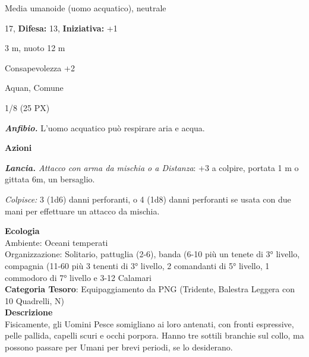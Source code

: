 \begin{multicols}{2}
{
\noindent
\begin{description}[noitemsep, topsep=0pt, parsep=0pt, partopsep=0pt, leftmargin=0cm, labelwidth=2.2cm]
	\item[\textbf{Taglia/Tipo:}] Media umanoide (uomo acquatico), neutrale
	\item[\textbf{Caratt.:}] 
	\item[\textbf{Punti Ferita:}] 17,  \textbf{Difesa:} 13,  \textbf{Iniziativa:} +1
	\item[\textbf{Movimento:}] 3 m, nuoto 12 m
	\item[\textbf{Tiri Salvez.:}] 
	\item[\textbf{Comp.:}] Consapevolezza +2
	\item[\textbf{Linguaggi:}] Aquan, Comune
	\item[\textbf{Sfida:}] 1/8 (25 PX)\smallskip
\end{description}

\emph{\textbf{Anfibio.}} L'uomo acquatico può respirare aria e acqua.

\textbf{Azioni}

\emph{\textbf{Lancia.} Attacco con arma da mischia o a Distanza}: +3 a colpire, portata 1 m o gittata 6m, un bersaglio.

\emph{Colpisce:} 3 (1d6) danni perforanti, o 4 (1d8) danni perforanti se usata con due mani per effettuare un attacco da mischia.

\textbf{Ecologia}\\
Ambiente: Oceani temperati\\
Organizzazione: Solitario, pattuglia (2-6), banda (6-10 più un tenete di 3° livello, compagnia (11-60 più 3 tenenti di 3° livello, 2 comandanti di 5° livello, 1 commodoro di 7° livello e 3-12 Calamari\\
\textbf{Categoria Tesoro}: Equipaggiamento da PNG (Tridente, Balestra Leggera con 10 Quadrelli, N)\\
\textbf{Descrizione}\\
Fisicamente, gli Uomini Pesce somigliano ai loro antenati, con fronti espressive, pelle pallida, capelli scuri e occhi porpora. Hanno tre sottili branchie sul collo, ma possono passare per Umani per brevi periodi, se lo desiderano.

}
\end{multicols}
